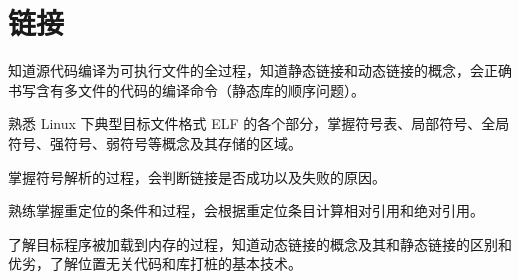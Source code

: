 \chapter{链接}\thispagestyle{empty}
    \begin{summary}
        \begin{compactitem}
            \item 知道源代码编译为可执行文件的全过程，知道静态链接和动态链接的概念，会正确书写含有多文件的代码的编译命令（静态库的顺序问题）。
            \item 熟悉 Linux 下典型目标文件格式 ELF 的各个部分，掌握符号表、局部符号、全局符号、强符号、弱符号等概念及其存储的区域。
            \item 掌握符号解析的过程，会判断链接是否成功以及失败的原因。
            \item 熟练掌握重定位的条件和过程，会根据重定位条目计算相对引用和绝对引用。
            \item 了解目标程序被加载到内存的过程，知道动态链接的概念及其和静态链接的区别和优劣，了解位置无关代码和库打桩的基本技术。
        \end{compactitem}
    \end{summary}

